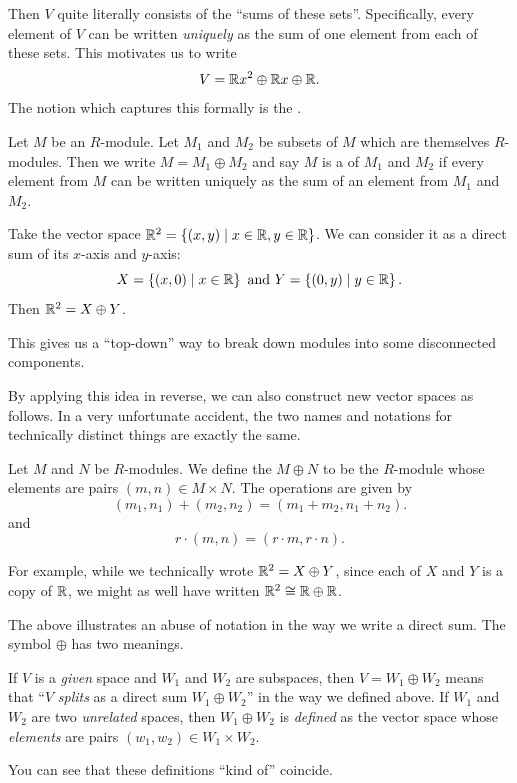 Then $V$ quite literally consists of the ``sums of these sets''.
Specifically, every element of $V$ can be written \emph{uniquely}
as the sum of one element from each of these sets.
This motivates us to write
\[ V = \mathbb R x^2 \oplus \mathbb R x \oplus \mathbb R. \]
The notion which captures this formally is the .

\begin{definition}
	\label{def:vector_space_direct_sum}
	Let $M$ be an $R$-module.
	Let $M_1$ and $M_2$ be subsets of $M$ which are themselves $R$-modules.
	Then we write $M = M_1 \oplus M_2$ and say $M$ is a 
	of $M_1$ and $M_2$
	if every element from $M$ can be written uniquely as the sum
	of an element from $M_1$ and $M_2$.
\end{definition}
\begin{example}
	Take the vector space $\mathbb R^2 = \left\{ (x,y) \mid x \in \mathbb R, y \in \mathbb R \right\}$.
	We can consider it as a direct sum of its $x$-axis and $y$-axis:
	\[ X = \left\{ (x,0) \mid x \in \mathbb R  \right\}
		\text{ and }
		Y = \left\{ (0,y) \mid y \in \mathbb R \right\}. \]
	Then $\mathbb R^2 = X \oplus Y$.
\end{example}

This gives us a ``top-down'' way to break down modules
into some disconnected components.

By applying this idea in reverse, we can also construct
new vector spaces as follows.
In a very unfortunate accident, the two names and notations for technically
distinct things are exactly the same.
\begin{definition}
	Let $M$ and $N$ be $R$-modules.
	We define the  $M \oplus N$
	to be the $R$-module whose elements are pairs $(m,n) \in M \times N$.
	The operations are given by
	\[ (m_1, n_1) + (m_2, n_2) = (m_1+m_2, n_1+n_2). \]
	and
	\[ r \cdot (m, n) = (r \cdot m, r \cdot n). \]
\end{definition}

For example, while we technically wrote $\mathbb R^2 = X \oplus Y$,
since each of $X$ and $Y$ is a copy of $\mathbb R$,
we might as well have written $\mathbb R^2 \cong \mathbb R \oplus \mathbb R$.

\begin{abuse}
	The above illustrates an abuse of notation in the way we write a direct sum. The symbol $\oplus$ has two meanings.
	\begin{itemize}
		\ii If $V$ is a \emph{given} space and $W_1$ and $W_2$ are subspaces, then $V = W_1 \oplus W_2$ means that ``$V$ \emph{splits} as a direct sum $W_1 \oplus W_2$'' in the way we defined above.
		\ii If $W_1$ and $W_2$ are two \emph{unrelated} spaces, then $W_1 \oplus W_2$ is \emph{defined} as the vector space whose \emph{elements} are pairs $(w_1, w_2) \in W_1 \times W_2$.
	\end{itemize}
	You can see that these definitions ``kind of'' coincide.
\end{abuse}

